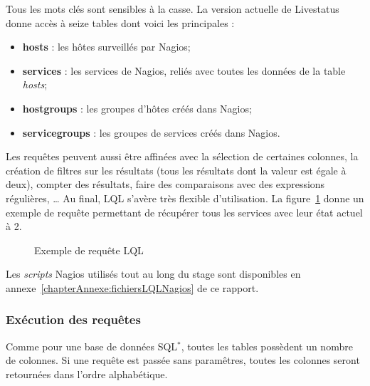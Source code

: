 Tous les mots cl\'es sont sensibles \`a la casse. 
La version actuelle de Livestatus donne acc\`es \`a seize tables dont voici les principales :

\begin{itemize}
	\item \textbf{hosts} : les h\^otes surveill\'es par Nagios;
	\item \textbf{services} : les services de Nagios, reli\'es avec toutes les donn\'ees de la table \textit{hosts};
	\item \textbf{hostgroups} : les groupes d'h\^otes cr\'e\'es dans Nagios;
	\item \textbf{servicegroups} : les groupes de services cr\'e\'es dans Nagios.

\end{itemize}

\vspace{0.20cm}

Les requ\^etes peuvent aussi \^etre affin\'ees avec la s\'election de certaines colonnes, la cr\'eation de filtres sur les r\'esultats (tous les r\'esultats dont la valeur est \'egale \`a deux), compter des r\'esultats, faire des comparaisons avec des expressions r\'eguli\`eres, \ldots{}
Au final, LQL s'av\`ere tr\`es flexible d'utilisation.
La figure~\ref{code:exempleLQL} donne un exemple de requ\^ete permettant de r\'ecup\'erer tous les services avec leur \'etat actuel \`a 2.

\vspace{0.20cm}

\begin{figure}[!ht]
	
	\caption{Exemple de requ\^ete LQL}
	\label{code:exempleLQL}

\end{figure}

Les \textit{scripts} Nagios utilis\'es tout au long du stage sont disponibles en annexe~\ref{chapterAnnexe:fichiersLQLNagios} de ce rapport.

\subsubsection{Ex\'ecution des requ\^etes}

Comme pour une base de donn\'ees SQL$^*$, toutes les tables poss\`edent un nombre de colonnes.
Si une requ\^ete est pass\'ee sans param\^etres, toutes les colonnes seront retourn\'ees dans l'ordre alphab\'etique.

